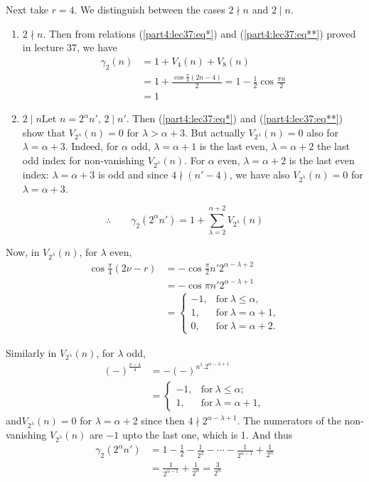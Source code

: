 Next take $r=4$. We distinguish between the cases $2\nmid n$ and
$2\mid n$.

\begin{enumerate}
\item $2\nmid n$. Then from relations (\ref{part4:lec37:eq*}) and
  (\ref{part4:lec37:eq**}) proved in lecture 37, we have
  \begin{align*}
    \gamma_2 (n) & = 1+ V_4 (n) + V_8 (n)\\
    & = 1 + \frac{\cos \frac{\pi}{4} (2n -4)}{2} =1 - \frac{1}{2} \cos
    \frac{\pi n}{2}\\
    & = 1
  \end{align*}
\item $2\mid n$\pageoriginale Let $n= 2^\alpha n'$, $2\mid n'$. Then
  (\ref{part4:lec37:eq*}) and (\ref{part4:lec37:eq**}) show that 
  $V_{2^\lambda} (n) =0$ for $\lambda > \alpha+3$. But actually $V_{2^
  \lambda} (n) =0$ also for $\lambda = \alpha+3$. Indeed, for $\alpha$
  odd, $\lambda = \alpha +1$ is the last even, $\lambda = \alpha+2$
  the last odd index for non-vanishing $V_{2^\lambda} (n)$. For $\alpha$
  even, $\lambda = \alpha +2$ is the last even index: $\lambda =
  \alpha +3$ is odd and since $4\nmid (n'-4)$, we have also $V_{2^\lambda} (n)
  =0$ for $\lambda= \alpha +3$.
\end{enumerate}
$$
\therefore \qquad \gamma_2 (2^\alpha n')= 1+ \sum^{\alpha+2}_{\lambda
=2} V_{2^\lambda} (n)
$$

Now, in $V_{2^\lambda} (n)$, for $\lambda$ even, 
\begin{align*}
  \cos \frac{\pi}{4} (2 \nu - r) & = - \cos \frac{\pi}{2} n' 2^{\alpha
  - \lambda +2}\\
  & = - \cos \pi n' 2^{\alpha - \lambda +1}\\
  & = 
  \begin{cases}
    -1, & \text{for}~ \lambda \leq \alpha,\\
    1, &  \text{for}~ \lambda = \alpha +1,\\
    0, & \text{for}~ \lambda = \alpha +2.
  \end{cases}
\end{align*}

Similarly in $V_{2^\lambda} (n)$, for $\lambda$ odd, 
\begin{align*}
(-)^{\frac{\nu-4}{4}} & = - (-)^{n^1. 2^{\alpha - \lambda +1}}\\
  & =
  \begin{cases}
    -1, & \text{for}~ \lambda \leq \alpha;\\
    1, & \text{for}~ \lambda = \alpha +1,
  \end{cases}
\end{align*}
and\pageoriginale $V_{2^\lambda} (n) =0$ for $\lambda = \alpha +2$
since then $4\nmid 2^{\alpha- \lambda +1}$. The numerators of the
non-vanishing $V_{2^\lambda} (n)$ are $-1$ upto the last one, which is
1. And thus
\begin{align*}
  \gamma_2 (2^\alpha n')& = 1 - \frac{1}{2} - \frac{1}{2^2} - \cdots -
  \frac{1}{2^{\alpha-1}} + \frac{1}{2^\alpha}\\
    & = \frac{1}{2^{\alpha-1}} + \frac{1}{2^\alpha} = \frac{3}{2^\alpha}
\end{align*}

